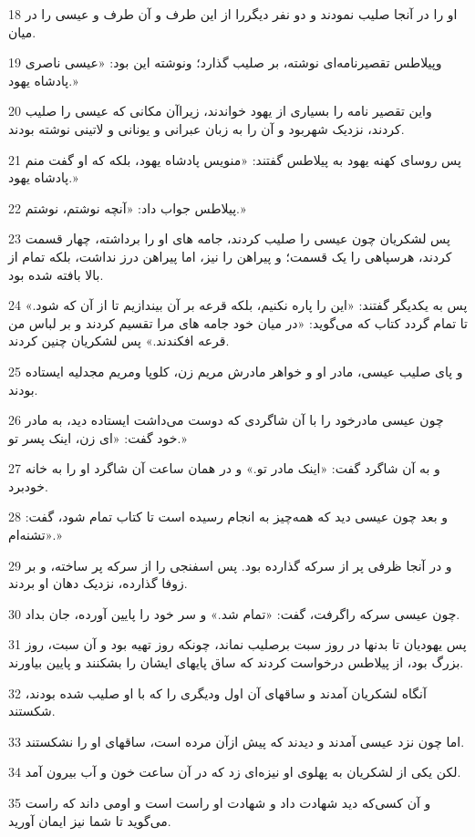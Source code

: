 \par 18 او را در آنجا صلیب نمودند و دو نفر دیگررا از این طرف و آن طرف و عیسی را در میان.
\par 19 وپیلاطس تقصیرنامه‌ای نوشته، بر صلیب گذارد؛ ونوشته این بود: «عیسی ناصری پادشاه یهود.»
\par 20 واین تقصیر نامه را بسیاری از یهود خواندند، زیراآن مکانی که عیسی را صلیب کردند، نزدیک شهربود و آن را به زبان عبرانی و یونانی و لاتینی نوشته بودند.
\par 21 پس روسای کهنه یهود به پیلاطس گفتند: «منویس پادشاه یهود، بلکه که او گفت منم پادشاه یهود.»
\par 22 پیلاطس جواب داد: «آنچه نوشتم، نوشتم.»
\par 23 پس لشکریان چون عیسی را صلیب کردند، جامه های او را برداشته، چهار قسمت کردند، هرسپاهی را یک قسمت؛ و پیراهن را نیز، اما پیراهن درز نداشت، بلکه تمام از بالا بافته شده بود.
\par 24 پس به یکدیگر گفتند: «این را پاره نکنیم، بلکه قرعه بر آن بیندازیم تا از آن که شود.» تا تمام گردد کتاب که می‌گوید: «در میان خود جامه های مرا تقسیم کردند و بر لباس من قرعه افکندند.» پس لشکریان چنین کردند.
\par 25 و پای صلیب عیسی، مادر او و خواهر مادرش مریم زن، کلوپا ومریم مجدلیه ایستاده بودند.
\par 26 چون عیسی مادرخود را با آن شاگردی که دوست می‌داشت ایستاده دید، به مادر خود گفت: «ای زن، اینک پسر تو.»
\par 27 و به آن شاگرد گفت: «اینک مادر تو.» و در همان ساعت آن شاگرد او را به خانه خودبرد.
\par 28 و بعد چون عیسی دید که همه‌چیز به انجام رسیده است تا کتاب تمام شود، گفت: «تشنه‌ام.»
\par 29 و در آنجا ظرفی پر از سرکه گذارده بود. پس اسفنجی را از سرکه پر ساخته، و بر زوفا گذارده، نزدیک دهان او بردند.
\par 30 چون عیسی سرکه راگرفت، گفت: «تمام شد.» و سر خود را پایین آورده، جان بداد.
\par 31 پس یهودیان تا بدنها در روز سبت برصلیب نماند، چونکه روز تهیه بود و آن سبت، روز بزرگ بود، از پیلاطس درخواست کردند که ساق پایهای ایشان را بشکنند و پایین بیاورند.
\par 32 آنگاه لشکریان آمدند و ساقهای آن اول ودیگری را که با او صلیب شده بودند، شکستند.
\par 33 اما چون نزد عیسی آمدند و دیدند که پیش ازآن مرده است، ساقهای او را نشکستند.
\par 34 لکن یکی از لشکریان به پهلوی او نیزه‌ای زد که در آن ساعت خون و آب بیرون آمد.
\par 35 و آن کسی‌که دید شهادت داد و شهادت او راست است و اومی داند که راست می‌گوید تا شما نیز ایمان آورید.
